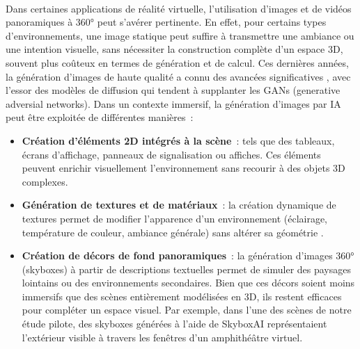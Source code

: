 \paragraph{}
Dans certaines applications de réalité virtuelle, l'utilisation d'images et de vidéos panoramiques
 à 360° peut s’avérer pertinente. En effet, pour certains types d’environnements, une image statique 
 peut suffire à transmettre une ambiance ou une intention visuelle, sans nécessiter la construction 
 complète d’un espace 3D, souvent plus coûteux en termes de génération et de calcul. Ces dernières 
 années, la génération d’images de haute qualité a connu des avancées significatives 
 \cite{li2025comprehensive}, avec l’essor des modèles de diffusion qui tendent à supplanter les GANs (generative
 adversial networks). Dans un contexte immersif, la génération d’images par IA peut être 
 exploitée de différentes manières :

\begin{itemize}
\item \textbf{Création d’éléments 2D intégrés à la scène} : tels que des tableaux, écrans d’affichage, 
panneaux de signalisation ou affiches. Ces éléments peuvent enrichir visuellement l’environnement sans 
recourir à des objets 3D complexes.

\item \textbf{Génération de textures et de matériaux} : la création dynamique de textures permet de
modifier l’apparence d’un environnement (éclairage, température de couleur, ambiance générale) sans
altérer sa géométrie \cite{CHEN2024112113}.

\item \textbf{Création de décors de fond panoramiques} : la génération d’images 360° (skyboxes) à partir
 de descriptions textuelles \cite{chen2023text2lightzeroshottextdrivenhdr} permet de simuler des 
 paysages lointains ou des environnements secondaires. Bien que ces décors soient moins immersifs que 
 des scènes entièrement modélisées en 3D, ils restent efficaces pour compléter un espace visuel. Par 
 exemple, dans l’une des scènes de notre étude pilote, des skyboxes générées à l’aide de SkyboxAI 
 représentaient l’extérieur visible à travers les fenêtres d’un amphithéâtre virtuel.

\end{itemize}
